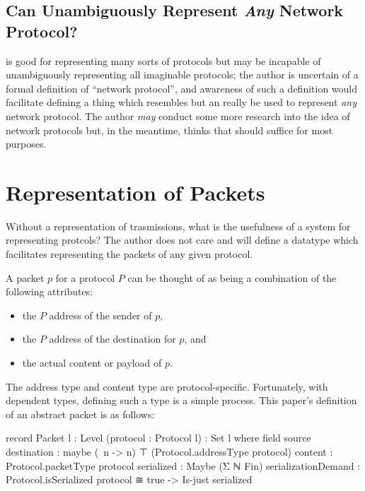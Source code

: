 \documentclass{report}
\begin{document}
\begin{itemize}
\section{Can  Unambiguously Represent \emph{Any} Network Protocol?}
 is good for representing many sorts of protocols but may be incapable of unambiguously representing all imaginable protocols; the author is uncertain of a formal definition of ``network protocol'', and awareness of such a definition would facilitate defining a thing which resembles  but an really be used to represent \emph{any} network protocol.  The author \emph{may} conduct some more research into the idea of network protocols but, in the meantime, thinks that  should suffice for most purposes.

\chapter{Representation of Packets}
Without a representation of trasmissions, what is the usefulness of a system for representing protcols?  The author does not care and will define a datatype which facilitates representing the packets of any given protocol.

A packet \(p\) for a protocol \(P\) can be thought of as being a combination of the following attributes:
\begin{itemize}
	\item the \(P\) address of the sender of \(p\),
	\item the \(P\) address of the destination for \(p\), and
	\item the actual content or payload of \(p\).
\end{itemize}

The address type and content type are protocol-specific.  Fortunately, with dependent types, defining such a type is a simple process.  This paper's definition of an abstract packet is as follows:

\begin{code}
  record Packet {l : Level} (protocol : Protocol l) : Set l where
    field
      source
       destination : maybe (\ n -> n) ⊤ (Protocol.addressType protocol)
      content : Protocol.packetType protocol
      serialized : Maybe (Σ ℕ Fin)
      serializationDemand  : Protocol.isSerialized protocol ≅ true
                          -> Is-just serialized
\end{code}


\end{itemize}
\end{document}
